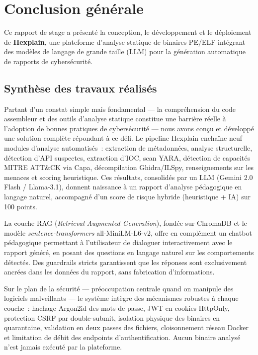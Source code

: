 
\chapter*{Conclusion générale}

Ce rapport de stage a présenté la conception, le développement et le déploiement de \textbf{Hexplain}, une plateforme d'analyse statique de binaires PE/ELF intégrant des modèles de langage de grande taille (LLM) pour la génération automatique de rapports de cybersécurité.

\section*{Synthèse des travaux réalisés}

Partant d'un constat simple mais fondamental --- la compréhension du code assembleur et des outils d'analyse statique constitue une barrière réelle à l'adoption de bonnes pratiques de cybersécurité --- nous avons conçu et développé une solution complète répondant à ce défi. Le pipeline Hexplain enchaîne neuf modules d'analyse automatisés~: extraction de métadonnées, analyse structurelle, détection d'API suspectes, extraction d'IOC, scan YARA, détection de capacités MITRE ATT\&CK via Capa, décompilation Ghidra/ILSpy, renseignements sur les menaces et scoring heuristique. Ces résultats, consolidés par un LLM (Gemini 2.0 Flash / Llama-3.1), donnent naissance à un rapport d'analyse pédagogique en langage naturel, accompagné d'un score de risque hybride (heuristique + IA) sur 100 points.

La couche RAG (\textit{Retrieval-Augmented Generation}), fondée sur ChromaDB et le modèle \textit{sentence-transformers} all-MiniLM-L6-v2, offre en complément un chatbot pédagogique permettant à l'utilisateur de dialoguer interactivement avec le rapport généré, en posant des questions en langage naturel sur les comportements détectés. Des guardrails stricts garantissent que les réponses sont exclusivement ancrées dans les données du rapport, sans fabrication d'informations.

Sur le plan de la sécurité --- préoccupation centrale quand on manipule des logiciels malveillants --- le système intègre des mécanismes robustes à chaque couche~: hachage Argon2id des mots de passe, JWT en cookies HttpOnly, protection CSRF par double-submit, isolation physique des binaires en quarantaine, validation en deux passes des fichiers, cloisonnement réseau Docker et limitation de débit des endpoints d'authentification. Aucun binaire analysé n'est jamais exécuté par la plateforme.

